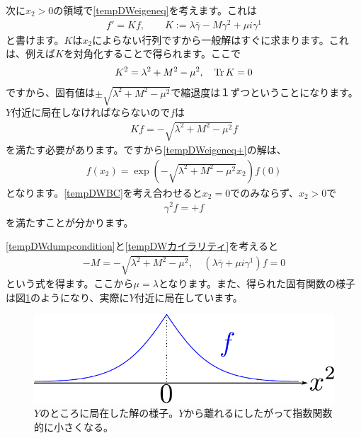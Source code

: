 \documentclass[paper=a4, fontsize=12pt, line_length=16cm, number_of_lines=33,dvipdfmx]{jlreq}
\numberwithin{equation}{section}
\newcommand{\gammab}{\bar{\gamma}}
\begin{document}
次に$x_2>0$の領域で\eqref{tempDWeigeneq}を考えます。これは
\begin{align}
  f'=Kf,\qquad K:=\lambda \gammab - M\gamma^2+\mu i\gamma^1
  \label{tempDWeigeneq+}
\end{align}
と書けます。$K$は$x_2$によらない行列ですから一般解はすぐに求まります。これは、例えば$K$を対角化することで得られます。ここで
\begin{align}
  K^2=\lambda^2+M^2-\mu^2,\quad \Tr K=0
\end{align}
ですから、固有値は$\pm\sqrt{\lambda^2+M^2-\mu^2}$で縮退度は１ずつということになります。$Y$付近に局在しなければならないので$f$は
\begin{align}
  Kf=-\sqrt{\lambda^2+M^2-\mu^2}f \label{tempDWdumpcondition}
\end{align}
を満たす必要があります。ですから\eqref{tempDWeigeneq+}の解は、
\begin{align}
  f(x_2)=\exp(-\sqrt{\lambda^2+M^2-\mu^2}x_2)f(0)
\end{align}
となります。\eqref{tempDWBC}を考え合わせると$x_2=0$でのみならず、$x_2>0$で
\begin{align}
  \gamma^2 f=+f\label{tempDWカイラリティ}
\end{align}
を満たすことが分かります。

\eqref{tempDWdumpcondition}と\eqref{tempDWカイラリティ}を考えると
\begin{align}
  -M=-\sqrt{\lambda^2+M^2-\mu^2},\quad (\lambda \gammab+\mu i\gamma^1)f=0
\end{align}
という式を得ます。ここから$\mu=\lambda$となります。また、得られた固有関数の様子は図\ref{fig:localized}のようになり、実際に$Y$付近に局在しています。
\begin{figure}[htbp]
  \centering
  \includegraphics{localized.pdf}
  \caption{$Y$のところに局在した解の様子。$Y$から離れるにしたがって指数関数的に小さくなる。}
  \label{fig:localized}
\end{figure}
\end{document}
